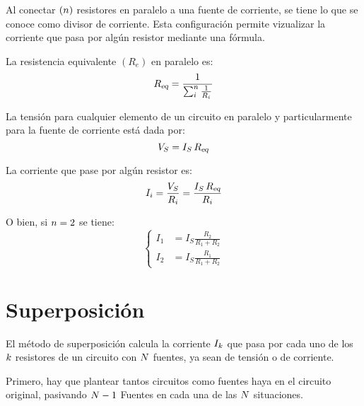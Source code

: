 \documentclass[a5paper,12pt,twoside]{book}
\begin{document}
Al conectar $(n)$ resistores en paralelo a una fuente de corriente, se tiene lo que se conoce como divisor de corriente. Esta configuración permite vizualizar la corriente que pasa por algún resistor mediante una fórmula.

\begin{center}
    \def\svgwidth{0.5\linewidth}
    
\end{center}

La resistencia equivalente $(R_e)$ en paralelo es:
\begin{equation*}
    {{R}_\textsl{{eq}}} = \frac{1}{\sum_i^n \frac{1}{R_i}}
\end{equation*}

La tensión para cualquier elemento de un circuito en paralelo y particularmente para la fuente de corriente está dada por:
\begin{equation*}
    V_S = I_S \, {{R}_\textsl{{eq}}}
\end{equation*}

La corriente que pase por algún resistor es:
\begin{equation*}
    I_i = \frac{V_S}{R_i} = \frac{I_S \, {{R}_\textsl{{eq}}}}{R_i}
\end{equation*}

O bien, si $n=2$ se tiene:
\begin{equation*}
    \left\{
    \begin{aligned}
        I_1 &= I_S \frac{R_2}{R_1 + R_2}
        \\
        I_2 &= I_S \frac{R_1}{R_1 + R_2}
    \end{aligned}
    \right.
\end{equation*}




\section{Superposición}

El método de superposición calcula la corriente $I_k$ que pasa por cada uno de los $k$ resistores de un circuito con $N$ fuentes, ya sean de tensión o de corriente.

Primero, hay que plantear tantos circuitos como fuentes haya en el circuito original, pasivando $N-1$ Fuentes en cada una de las $N$ situaciones.
\end{document}
